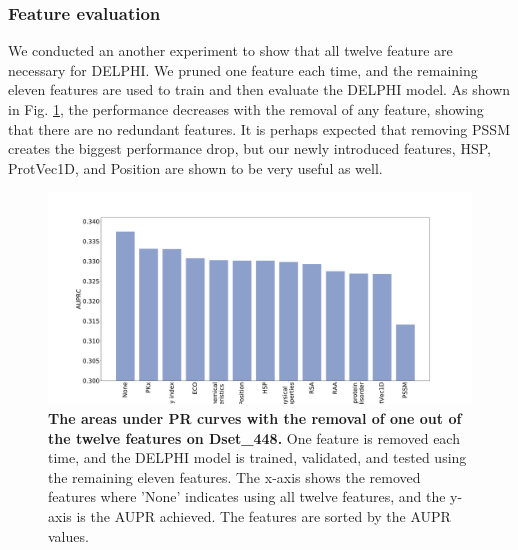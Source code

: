 \documentclass{bioinfo}
\begin{document}
\subsubsection{Feature evaluation}
We conducted an another experiment to show that all twelve feature are necessary for DELPHI. We pruned one feature each time, and the remaining eleven features are used to train and then evaluate the DELPHI model. As shown in Fig. \ref{fig_remove_each_feature}, the performance decreases with the removal of any feature, showing that there are no redundant features. It is perhaps expected that  removing PSSM creates the biggest performance drop, but our newly introduced features, HSP, ProtVec1D, and Position are shown to be  very useful as well. 

\begin{figure}
\centering
\includegraphics[width=\columnwidth]{remove_features_individually_Testing.pdf}
  \caption{\textbf{The areas under PR curves with the removal of one out of the twelve features on Dset\_448.} One feature is removed each time, and the DELPHI model is trained, validated, and tested using the remaining eleven features. The x-axis shows the removed features where 'None' indicates using all twelve features, and the y-axis is the AUPR achieved. The features are sorted by the AUPR values. 
  \label{fig_remove_each_feature}}
\end{figure}
\end{document}
